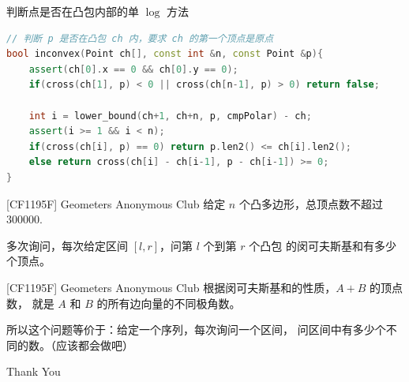 \documentclass{beamer}
\begin{document}
\begin{frame}[fragile]{判断点是否在凸包内部的单 $\log$ 方法}
    \small
    \begin{lstlisting}[language=c++]
// 判断 p 是否在凸包 ch 内，要求 ch 的第一个顶点是原点
bool inconvex(Point ch[], const int &n, const Point &p){
    assert(ch[0].x == 0 && ch[0].y == 0);
    if(cross(ch[1], p) < 0 || cross(ch[n-1], p) > 0) return false;
    
    int i = lower_bound(ch+1, ch+n, p, cmpPolar) - ch;
    assert(i >= 1 && i < n);
    if(cross(ch[i], p) == 0) return p.len2() <= ch[i].len2();
    else return cross(ch[i] - ch[i-1], p - ch[i-1]) >= 0;
}
    \end{lstlisting}
\end{frame}

\begin{frame}{[CF1195F] Geometers Anonymous Club}
    \small
    给定 $n$ 个凸多边形，总顶点数不超过 $300000$.

    \vspace{1em}
    多次询问，每次给定区间 $[l,r]$，问第 $l$ 个到第 $r$ 个凸包
    的闵可夫斯基和有多少个顶点。
\end{frame}

\begin{frame}{[CF1195F] Geometers Anonymous Club}
    \small
    根据闵可夫斯基和的性质，$A+B$ 的顶点数，
    就是 $A$ 和 $B$ 的所有边向量的不同极角数。

    \vspace{1em}
    所以这个问题等价于：给定一个序列，每次询问一个区间，
    问区间中有多少个不同的数。（应该都会做吧）
\end{frame}

\begin{frame}
    \begin{center}
        {\Huge\calligra Thank You}
    \end{center}
\end{frame}
\end{document}
